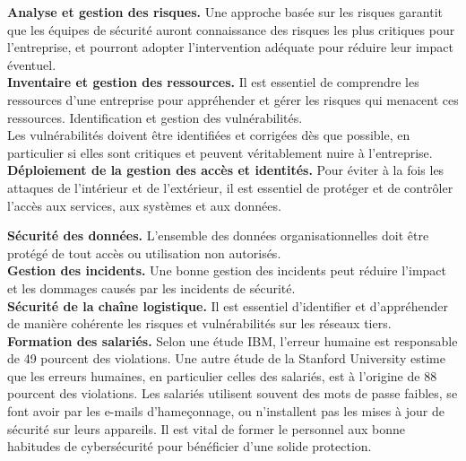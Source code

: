   \textbf{Analyse et gestion des risques.} Une approche basée sur les risques garantit que les équipes de sécurité auront connaissance des risques les plus critiques pour l’entreprise, et pourront adopter l’intervention adéquate pour réduire leur impact éventuel.\\
  \textbf{Inventaire et gestion des ressources.} Il est essentiel de comprendre les ressources d’une entreprise pour appréhender et gérer les risques qui menacent ces ressources.
  Identification et gestion des vulnérabilités.\\ Les vulnérabilités doivent être identifiées et corrigées dès que possible, en particulier si elles sont critiques et peuvent véritablement nuire à l’entreprise.\\
  
  \textbf{Déploiement de la gestion des accès et identités.} Pour éviter à la fois les attaques de l’intérieur et de l’extérieur, il est essentiel de protéger et de contrôler l’accès aux services, aux systèmes et aux données.
  
  \textbf{Sécurité des données.} L’ensemble des données organisationnelles doit être protégé de tout accès ou utilisation non autorisés.\\
  
  \textbf{Gestion des incidents.} Une bonne gestion des incidents peut réduire l’impact et les dommages causés par les incidents de sécurité.\\
  
  \textbf{Sécurité de la chaîne logistique.} Il est essentiel d’identifier et d’appréhender de manière cohérente les risques et vulnérabilités sur les réseaux tiers.\\
  
  \textbf{Formation des salariés.} Selon une étude IBM, l’erreur humaine est responsable de 49 pourcent  des violations. Une autre étude de la Stanford University estime que les erreurs humaines, en particulier celles des salariés, est à l’origine de 88 pourcent des violations. Les salariés utilisent souvent des mots de passe faibles, se font avoir par les e-mails d’hameçonnage, ou n’installent pas les mises à jour de sécurité sur leurs appareils. Il est vital de former le personnel aux bonne habitudes de cybersécurité pour bénéficier d’une solide protection.\\
